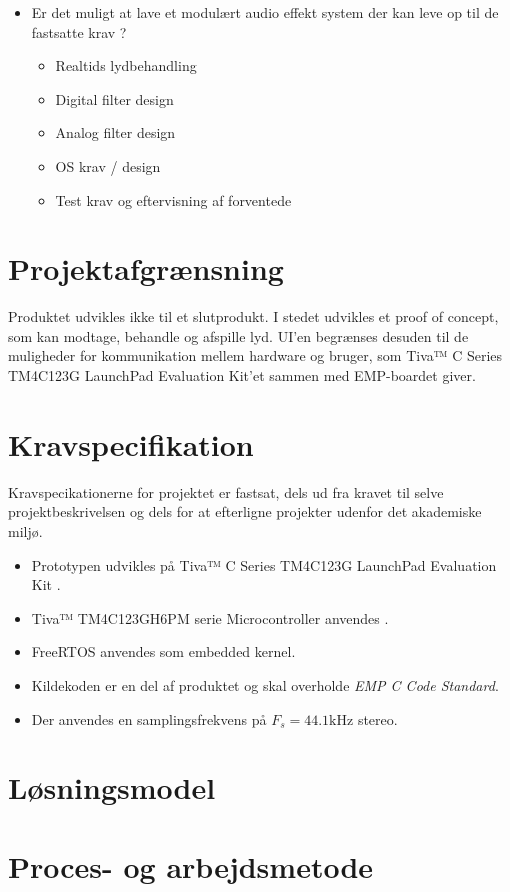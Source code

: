 \begin{itemize}
	\item Er det muligt at lave et modulært audio effekt system der kan leve op til de fastsatte krav ? 

	\begin{itemize}
		
		\item Realtids lydbehandling 
		\item Digital filter design
		\item Analog filter design
		\item OS krav / design
		\item Test krav og eftervisning af forventede
	\end{itemize}
\end{itemize}

\section{Projektafgrænsning}
Produktet udvikles ikke til et slutprodukt. 
I stedet udvikles et proof of concept, som kan modtage, behandle og afspille lyd. 
UI'en begrænses desuden til de muligheder for kommunikation mellem hardware og bruger, som Tiva™ C Series TM4C123G LaunchPad Evaluation Kit'et sammen med EMP-boardet giver. 

\section{Kravspecifikation} 
Kravspecikationerne for projektet er fastsat, dels ud fra kravet til selve projektbeskrivelsen og dels for at efterligne projekter udenfor det akademiske miljø.

\begin{itemize}[noitemsep]
	\item Prototypen udvikles på Tiva™ C Series TM4C123G LaunchPad Evaluation Kit \cite{spmt281a}.
	\item Tiva™ TM4C123GH6PM serie Microcontroller anvendes \cite{spmu296}.
	\item FreeRTOS anvendes som embedded kernel.
	\item Kildekoden er en del af produktet og skal overholde \textit{EMP C Code Standard}\cite{emp-c}.
	\item Der anvendes en samplingsfrekvens på $F_s = 44.1 \si{\kilo\hertz}$ stereo.
\end{itemize}


\section{Løsningsmodel}

\section{Proces- og arbejdsmetode}
